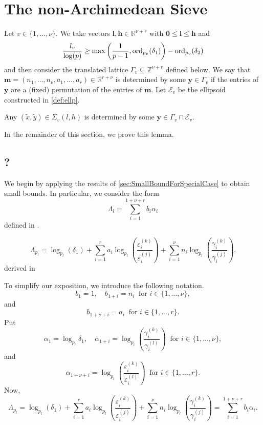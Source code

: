 \section{The non-Archimedean Sieve}
\label{sec:nonArchSieve}

Let $v \in \{1, \dots, \nu\}$. We take vectors $\mathbf{l},\mathbf{h} \in \mathbb{R}^{\nu+r}$ with $\mathbf{0} \leq \mathbf{l} \leq \mathbf{h}$ and 
\[\frac{l_v}{\log(p)} \geq \max\left( \frac{1}{p-1}, \operatorname{ord}_{p_v}(\delta_1)\right) - \operatorname{ord}_{p_v}(\delta_2)\]
and then consider the translated lattice $\Gamma_v \subseteq \mathbb{Z}^{\nu + r}$ defined below. We say that ${\mathbf{m} = (n_1, \dots, n_{\nu}, a_1, \dots, a_r) \in \mathbb{R}^{r + \nu}}$ is determined by some $\mathbf{y} \in \Gamma_v$ if the entries of $\mathbf{y}$ are a (fixed) permutation of the entries of $\mathbf{m}$. Let $\mathcal{E}_v$ be the ellipsoid constructed in \eqref{def:ellp}. 

\begin{lemma}
Any $(\tilde{x},\tilde{y}) \in \Sigma_v(l,h)$ is determined by some $\mathbf{y} \in \Gamma_v \cap \mathcal{E}_v$. 
\end{lemma}

In the remainder of this section, we prove this lemma. 

\subsection{?}
We begin by applying the results of \autoref{sec:SmallBoundForSpecialCase} to obtain small bounds. In particular, we consider the form
\[\Lambda_l = \sum_{i = 1}^{1+\nu+r} b_i\alpha_i\]
defined in \label{sec:SmallBoundForSpecialCase}. 

\[\Lambda_{p_l} = \log_{p_l}(\delta_1) + \sum_{i=1}^r a_i\log_{p_l}\left( \frac{\varepsilon_i^{(k)}}{\varepsilon_i^{(j)}}\right) + \sum_{i=1}^{\nu} n_i \log_{p_l} \left( \frac{\gamma_i^{(k)}}{\gamma_i^{(j)}}\right).\]
derived in 

To simplify our exposition, we introduce the following notation. 
\[b_1 = 1, \quad b_{1+i} = n_i \ \text{ for } i \in \{1, \dots, \nu\},\]
and
\[ b_{1 + \nu+i} = a_i \ \text{ for } i \in \{1, \dots, r\}.\]
Put
\[\alpha_1 = \log_{p_l} \delta_1, \quad \alpha_{1+i} = \log_{p_l}\left( \frac{\gamma_i^{(k)}}{\gamma_i^{(l)}}\right)  \ \text{ for } i \in \{1, \dots, \nu\},\]
and
\[\alpha_{1+ \nu+i} = \log_{p_l}\left( \frac{\varepsilon_i^{(k)}}{\varepsilon_i^{(l)}}\right)
\ \text{ for } i \in \{1, \dots, r\}.\]
Now, 
\[\Lambda_{p_l} = \log_{p_l}(\delta_1) + \sum_{i=1}^r a_i\log_{p_l}\left( \frac{\varepsilon_i^{(k)}}{\varepsilon_i^{(j)}}\right) + \sum_{i=1}^{\nu} n_i \log_{p_l} \left( \frac{\gamma_i^{(k)}}{\gamma_i^{(j)}}\right) = \sum_{i = 1}^{1 + \nu + r} b_i\alpha_i.\]


